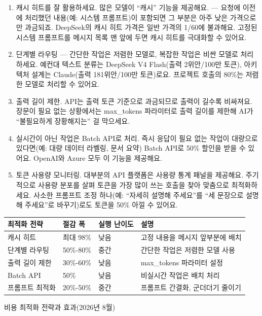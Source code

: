 \begin{enumerate}
  \item 캐시 히트를 잘 활용하세요. 많은 모델이 “캐시” 기능을 제공해요. — 요청에 이전에 처리했던 내용(예: 시스템 프롬프트)이 포함되면 그 부분은 아주 낮은 가격으로만 과금되죠. DeepSeek의 캐시 히트 가격은 일반 가격의 1/60에 불과해요. 고정된 시스템 프롬프트를 메시지 목록 맨 앞에 두면 캐시 히트를 극대화할 수 있어요.
  \item 단계별 라우팅 — 간단한 작업은 저렴한 모델로, 복잡한 작업은 비싼 모델로 처리하세요. 예컨대 텍스트 분류는 DeepSeek V4 Flash(출력 2위안/100만 토큰), 아키텍처 설계는 Claude(출력 181위안/100만 토큰)로요. 프로젝트 호출의 80\%는 저렴한 모델로 처리할 수 있어요.
  \item 출력 길이 제한. API는 출력 토큰 기준으로 과금되므로 출력이 길수록 비싸져요. 장문이 필요 없는 상황에서는 max\_tokens 파라미터로 출력 길이를 제한해 AI가 “불필요하게 장황해지는” 걸 막으세요.
  \item 실시간이 아닌 작업은 Batch API로 처리. 즉시 응답이 필요 없는 작업이 대량으로 있다면(예: 대량 데이터 라벨링, 문서 요약) Batch API로 50\% 할인을 받을 수 있어요. OpenAI와 Azure 모두 이 기능을 제공해요.
  \item 토큰 사용량 모니터링. 대부분의 API 플랫폼은 사용량 통계 패널을 제공해요. 주기적으로 사용량 분포를 살펴 토큰을 가장 많이 쓰는 호출을 찾아 맞춤으로 최적화하세요. 사소한 프롬프트 조정 하나(예: “자세히 설명해 주세요”를 “세 문장으로 설명해 주세요”로 바꾸기)로도 토큰을 50\% 아낄 수 있어요.
\end{enumerate}

\begin{center}
\begin{tabularx}{\linewidth}{|X|X|X|X|}
\hline
\textbf{최적화 전략} & \textbf{절감 폭} & \textbf{실행 난이도} & \textbf{설명} \tabularnewline
\hline
캐시 히트 & 최대 98\% & 낮음 & 고정 내용을 메시지 앞부분에 배치 \tabularnewline
단계별 라우팅 & 50\%-80\% & 중간 & 간단한 작업은 저렴한 모델 사용 \tabularnewline
출력 길이 제한 & 30\%-60\% & 낮음 & max\_tokens 파라미터 설정 \tabularnewline
Batch API & 50\% & 낮음 & 비실시간 작업은 배치 처리 \tabularnewline
프롬프트 최적화 & 20\%-50\% & 중간 & 프롬프트 간결화, 군더더기 줄이기 \tabularnewline
\hline
\end{tabularx}
\end{center}

\begin{center}\small\color{gray}비용 최적화 전략과 효과(2026년 8월)\end{center}

